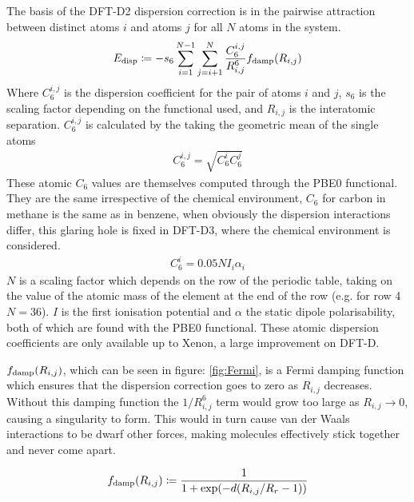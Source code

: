 \documentclass[10pt,a4paper,twocolumn,twoside]{extarticle}
\begin{document}
	The basis of the DFT-D2 dispersion correction is in the pairwise attraction between distinct atoms $i$ and atoms $j$ for all $N$ atoms in the system. \cite{Grimme2006}
	\begin{align} \label{eq:D2}
	E_{\rm disp} \coloneqq -s_6 \sum^{N-1}_{i=1} \sum^N_{j=i+1} \frac{C^{i,j}_{6}}{R^6_{i,j}} f_{\rm damp}(R_{i,j})
	\end{align} 
	\noindent
	Where $C_6^{i,j}$ is the dispersion coefficient for the pair of atoms $i$ and $j$, $s_6$ is the scaling factor depending on the functional used, and $R_{i,j}$ is the interatomic separation. 
	$C_6^{i,j}$ is calculated by the taking the geometric mean of the single atoms 
	\begin{align} \label{eq:C6ij}
		C_6^{i,j} = \sqrt{C_6^i C_6^j}
	\end{align}
	These atomic $C_6$ values are themselves computed through the PBE0 functional\cite{Grimme2011}. They are the same irrespective of the chemical environment, $C_6$ for carbon in methane is the same as in benzene, when obviously the dispersion interactions differ, this glaring hole is fixed in DFT-D3, where the chemical environment is considered.
	\begin{align} \label{eq:C6i}
		C_6^i = 0.05NI_i \alpha_i
	\end{align}
	$N$ is a scaling factor which depends on the row of the periodic table, taking on the value of the atomic mass of the element at the end of the row (e.g. for row 4 $N = 36$). $I$ is the first ionisation potential and $\alpha$ the static dipole polarisability, both of which are found with the PBE$0$ functional. These atomic dispersion coefficients are only available up to Xenon, a large improvement on DFT-D.

	$f_{\rm damp}(R_{i,j})$, which can be seen in figure: \ref{fig:Fermi}, is a Fermi damping function which ensures that the dispersion correction goes to zero as $R_{i,j}$ decreases. Without this damping function the $1/R_{i,j}^6$ term would grow too large as $R_{i,j} \rightarrow 0$, causing a singularity to form. This would in turn cause van der Waals interactions to be dwarf other forces, making molecules effectively stick together and never come apart.

	\begin{align} \label{eq:damp}
		f_{\rm damp}(R_{i,j}) \coloneqq \frac{1}{1+\exp(-d(R_{i,j}/R_r -1))}
	\end{align}
\end{document}
